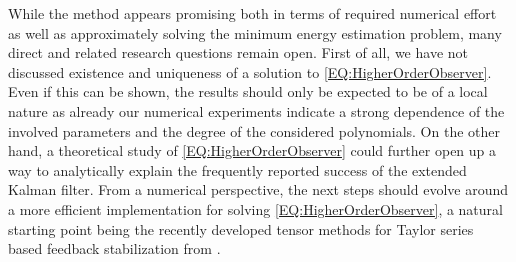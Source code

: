 \documentclass[11pt,reqno]{amsart}
\numberwithin{equation}{section}
\theoremstyle{plain}
\begin{document}
While the method appears promising both in terms of required numerical effort as well as approximately solving the minimum energy estimation problem, many direct and related research questions remain open. First of all, we have not discussed existence and uniqueness of a solution to \cref{EQ:HigherOrderObserver}. Even if this can be shown, the results should only be expected to be of a local nature as already our numerical experiments indicate a strong dependence of the involved parameters and the degree of the considered polynomials. On the other hand, a theoretical study of \cref{EQ:HigherOrderObserver} could further open up a way to analytically explain the frequently reported success of the extended Kalman filter. From a numerical perspective, the next steps should evolve around a more efficient implementation for solving \cref{EQ:HigherOrderObserver}, a natural starting point being the recently developed tensor methods for Taylor series based feedback stabilization from \cite{Kraetal24,CorK25}.
%
%


 
\end{document}
